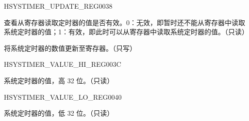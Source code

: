 \begin{register}{H}{SYSTIMER\_UPDATE\_REG}{\hexprefix{}0038}\label{regdesc:SYSTIMERUPDATEREG}
%
%
%
\regnewline%
\begin{regdesc}\begin{reglist}
\label{fielddesc:SYSTIMERTIMERVALUEVALID}\item [SYSTIMER\_TIMER\_VALUE\_VALID] 查看从寄存器读取定时器的值是否有效。0：无效，即暂时还不能从寄存器中读取系统定时器的值；1：有效，即此时可以从寄存器中读取系统定时器的值。（只读）
\label{fielddesc:SYSTIMERTIMERUPDATE}\item [SYSTIMER\_TIMER\_UPDATE] 将系统定时器的数值更新至寄存器。（只写）
\end{reglist}\end{regdesc}
\end{register}


\begin{register}{H}{SYSTIMER\_VALUE\_HI\_REG}{\hexprefix{}003C}\label{regdesc:SYSTIMERVALUEHIREG}
%
\regnewline%
\begin{regdesc}\begin{reglist}
\label{fielddesc:SYSTIMERTIMERVALUEHI}\item [SYSTIMER\_TIMER\_VALUE\_HI] 系统定时器的值，高 32 位。（只读）
\end{reglist}\end{regdesc}
\end{register}


\begin{register}{H}{SYSTIMER\_VALUE\_LO\_REG}{\hexprefix{}0040}\label{regdesc:SYSTIMERVALUELOREG}
%
\regnewline%
\begin{regdesc}\begin{reglist}
\label{fielddesc:SYSTIMERTIMERVALUELO}\item [SYSTIMER\_TIMER\_VALUE\_LO] 系统定时器的值，低 32 位。（只读）
\end{reglist}\end{regdesc}
\end{register}



